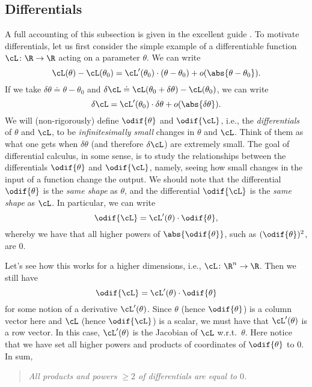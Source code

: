 \documentclass[../../book-main.tex]{subfiles}
\begin{document}
\subsection{Differentials}

A full accounting of this subsection is given in the excellent guide \cite{bright2025matrix}.
To motivate differentials, let us first consider the simple example of a differentiable function \(\cL \colon \R \to \R\) acting on a parameter \(\theta\). We can write 
\begin{equation}
    \cL(\theta) - \cL(\theta_{0}) = \cL^{\prime}(\theta_{0})\cdot(\theta - \theta_{0}) + o(\abs{\theta - \theta_{0}}).
\end{equation}
If we take \(\delta\theta \doteq \theta - \theta_{0}\) and \(\delta\cL \doteq \cL(\theta_{0} + \delta\theta) - \cL(\theta_{0})\), we can write 
\begin{equation}
    \delta\cL = \cL^{\prime}(\theta_{0})\cdot\delta\theta + o(\abs{\delta\theta}).
\end{equation}
We will (non-rigorously) define \(\odif{\theta}\) and \(\odif{\cL}\), i.e., the \textit{differentials} of \(\theta\) and \(\cL\), to be \textit{infinitesimally small} changes in \(\theta\) and \(\cL\). 
Think of them as what one gets when \(\delta\theta\) (and therefore \(\delta \cL\)) are extremely small. The goal of differential calculus, in some sense, is to study the relationships between the differentials \(\odif{\theta}\) and \(\odif{\cL}\), namely, seeing how small changes in the input of a function change the output. We should note that the differential \(\odif{\theta}\) is the \textit{same shape} as \(\theta\), and the differential \(\odif{\cL}\) is the \textit{same shape} as \(\cL\). In particular, we can write 
\begin{equation}
    \odif{\cL} = \cL^{\prime}(\theta)\cdot\odif{\theta},
\end{equation}
whereby we have that all higher powers of \(\abs{\odif{\theta}}\), such as \((\odif{\theta})^{2}\), are \(0\).

Let's see how this works for a higher dimensions, i.e., \(\cL \colon \R^{n} \to \R\). Then we still have 
\begin{equation}
    \odif{\cL} = \cL^{\prime}(\theta)\cdot\odif{\theta}
\end{equation}
for some notion of a derivative \(\cL^{\prime}(\theta)\). Since \(\theta\) (hence \(\odif{\theta}\)) is a column vector here and \(\cL\) (hence \(\odif{\cL}\)) is a scalar, we must have that \(\cL^{\prime}(\theta)\) is a row vector. In this case, \(\cL^{\prime}(\theta)\) is the Jacobian of \(\cL\) w.r.t.~\(\theta\). Here notice that we have set all higher powers and products of coordinates of \(\odif{\theta}\)  to \(0\). In sum,
\begin{quote}
    \centering
    \textit{All products and powers \(\geq 2\) of differentials are equal to \(0\).}
\end{quote}
\end{document}
